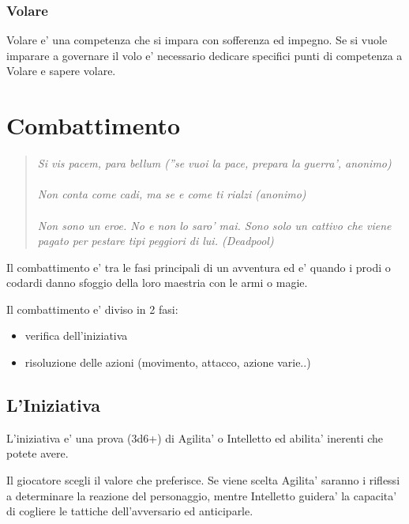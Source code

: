 \documentclass[a4paper,11pt,twoside,openany]{book}
\begin{document}
\subsubsection{Volare}

\label{volare}

Volare e' una competenza che si impara con sofferenza ed impegno. Se si vuole imparare a governare il volo e' necessario dedicare specifici punti di competenza a Volare e sapere volare.

\pagebreak

\section{Combattimento}

\label{combattimento}
\begin{quote}\textit{
Si vis pacem, para bellum (''se vuoi la pace, prepara la guerra', anonimo)\\\\
Non conta come cadi, ma se e come ti rialzi (anonimo)\\\\
Non sono un eroe. No e non lo saro' mai. Sono solo un cattivo che viene pagato per pestare tipi peggiori di lui. (Deadpool)
}\end{quote}

Il combattimento e' tra le fasi principali di un avventura ed e' quando i prodi o codardi danno sfoggio della loro maestria con le armi o magie.

\bigskip

Il combattimento e' diviso in 2 fasi:
\begin{itemize}
\item verifica dell'iniziativa 
\item risoluzione delle azioni (movimento, attacco, azione varie..) 
\end{itemize}

\subsection{L'Iniziativa}

\label{liniziativa}

L'iniziativa e' una prova (3d6+) di Agilita' o Intelletto ed abilita' inerenti che potete avere.

Il giocatore scegli il valore che preferisce. Se viene scelta Agilita' saranno i riflessi a determinare la reazione del personaggio, mentre Intelletto guidera' la capacita' di cogliere le tattiche dell'avversario ed anticiparle.
\end{document}
